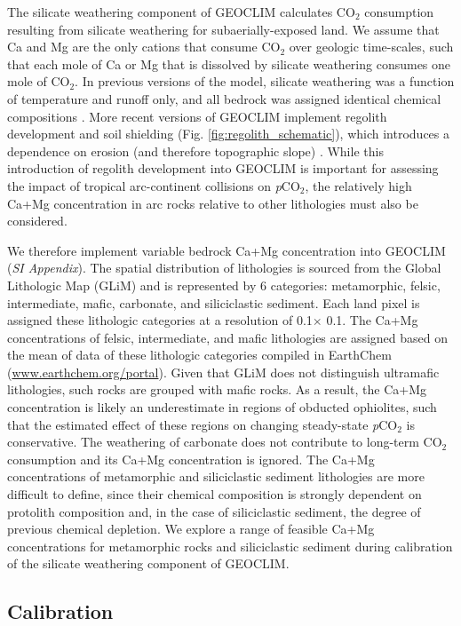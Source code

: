 \documentclass[9pt,twocolumn,twoside,lineno]{pnas-new}
\newcommand{\degrees}{\textdegree\xspace}
\newcommand{\pCOtwo}{\textit{p}CO$_{2}$\xspace}
\newcommand{\COtwo}{CO$_{2}$\xspace}
\newcommand{\SI}{\textit{SI Appendix}\xspace}
\begin{document}
The silicate weathering component of GEOCLIM calculates \COtwo consumption resulting from silicate weathering for subaerially-exposed land. We assume that Ca and Mg are the only cations that consume \COtwo over geologic time-scales, such that each mole of Ca or Mg that is dissolved by silicate weathering consumes one mole of \COtwo. In previous versions of the model, silicate weathering was a function of temperature and runoff only, and all bedrock was assigned identical chemical compositions \cite{Godderis2017c}. More recent versions of GEOCLIM implement regolith development and soil shielding (Fig. \ref{fig:regolith_schematic}), which introduces a dependence on erosion (and therefore topographic slope) \cite{Maffre2018a}. While this introduction of regolith development into GEOCLIM is important for assessing the impact of tropical arc-continent collisions on \pCOtwo, the relatively high Ca+Mg concentration in arc rocks relative to other lithologies must also be considered. 

We therefore implement variable bedrock Ca+Mg concentration into GEOCLIM (\SI). The spatial distribution of lithologies is sourced from the Global Lithologic Map (GLiM) \cite{Hartmann2012a} and is represented by 6 categories: metamorphic, felsic, intermediate, mafic, carbonate, and siliciclastic sediment. Each land pixel is assigned these lithologic categories at a resolution of 0.1\degrees $\times$ 0.1\degrees. The Ca+Mg concentrations of felsic, intermediate, and mafic lithologies are assigned based on the mean of data of these lithologic categories compiled in EarthChem (\url{www.earthchem.org/portal}). Given that GLiM does not distinguish ultramafic lithologies, such rocks are grouped with mafic rocks. As a result, the Ca+Mg concentration is likely an underestimate in regions of obducted ophiolites, such that the estimated effect of these regions on changing steady-state \pCOtwo is conservative. The weathering of carbonate does not contribute to long-term \COtwo consumption and its Ca+Mg concentration is ignored. The Ca+Mg concentrations of metamorphic and siliciclastic sediment lithologies are more difficult to define, since their chemical composition is strongly dependent on protolith composition and, in the case of siliciclastic sediment, the degree of previous chemical depletion. We explore a range of feasible Ca+Mg concentrations for metamorphic rocks and siliciclastic sediment during calibration of the silicate weathering component of GEOCLIM.

\subsection*{Calibration}
\end{document}
